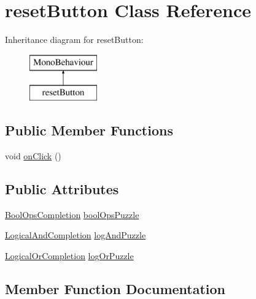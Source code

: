 \hypertarget{classreset_button}{}\section{reset\+Button Class Reference}
\label{classreset_button}
Inheritance diagram for reset\+Button\+:\begin{figure}[H]
\begin{center}
\leavevmode
\includegraphics[height=2.000000cm]{classreset_button}
\end{center}
\end{figure}
\subsection*{Public Member Functions}
\begin{DoxyCompactItemize}
\item 
void \hyperlink{classreset_button_ae7c1b626473f544cc48e9f8baac71bc2}{on\+Click} ()
\end{DoxyCompactItemize}
\subsection*{Public Attributes}
\begin{DoxyCompactItemize}
\item 
\hyperlink{class_bool_ops_completion}{Bool\+Ops\+Completion} \hyperlink{classreset_button_a925179bba89fb6a34faa295e1ad34d55}{bool\+Ops\+Puzzle}
\item 
\hyperlink{class_logical_and_completion}{Logical\+And\+Completion} \hyperlink{classreset_button_a6a9696f84fedc3c1c25eb5de3162a760}{log\+And\+Puzzle}
\item 
\hyperlink{class_logical_or_completion}{Logical\+Or\+Completion} \hyperlink{classreset_button_ae3e39078f403612b4070e88568015de6}{log\+Or\+Puzzle}
\end{DoxyCompactItemize}


\subsection{Member Function Documentation}
\mbox{\label{classreset_button_ae7c1b626473f544cc48e9f8baac71bc2}} 
